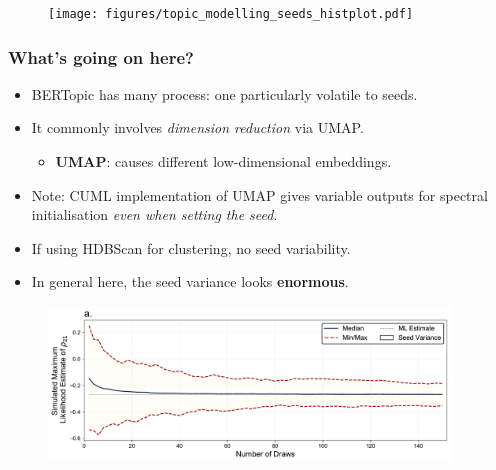 \documentclass[12pt]{beamer}
\begin{document}
\begin{frame}
\begin{center}
\begin{figure}
	\texttt{[image: figures/topic\_modelling\_seeds\_histplot.pdf]}
\end{figure}
\end{center}
\end{frame}

\begin{frame}
\frametitle{What's going on here?}
	\begin{itemize}
	    \item BERTopic has many process: one particularly volatile to seeds.\vspace{.1in}
		\item It commonly involves \emph{dimension reduction} via UMAP.\vspace{.1in}
		\begin{itemize}
		    \item \textbf{UMAP}: causes different low-dimensional embeddings.\vspace{.1in}
		\end{itemize}
		\item Note: CUML implementation of UMAP gives variable outputs for spectral initialisation \textit{even when setting the seed}.\vspace{.1in}
		\item If using HDBScan for clustering, no seed variability.\vspace{.1in}
		\item In general here, the seed variance looks \textbf{enormous}.
	\end{itemize}
\end{frame}

\begin{frame}
\begin{center}
\begin{figure}
	\includegraphics[width=0.95\textwidth]{./figures/mvprobit.pdf}
\end{figure}
\end{center}
\end{frame}
\end{document}
